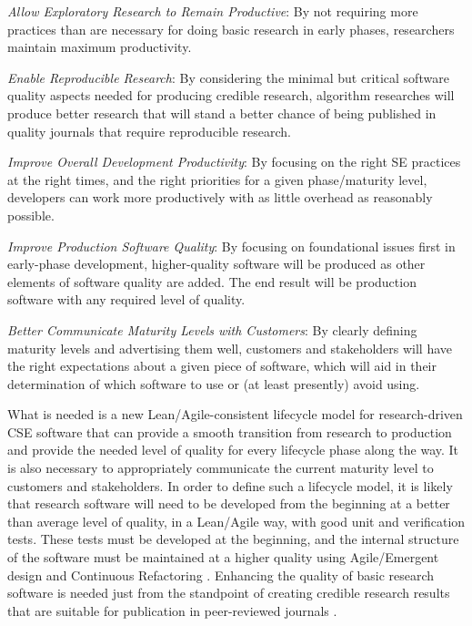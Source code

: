 \documentclass[11pt]{SANDreport}
\begin{document}
\begin{compactitem}

{}\item\textit{Allow Exploratory Research to Remain Productive}: By
not requiring more practices than are necessary for doing basic
research in early phases, researchers maintain maximum productivity.

{}\item\textit{Enable Reproducible Research}: By considering the
minimal but critical software quality aspects needed for producing
credible research, algorithm researches will produce better research
that will stand a better chance of being published in quality journals
that require reproducible research.

{}\item\textit{Improve Overall Development Productivity}: By focusing
on the right SE practices at the right times, and the right priorities
for a given phase/maturity level, developers can work more
productively with as little overhead as reasonably possible.

{}\item\textit{Improve Production Software Quality}: By focusing on
foundational issues first in early-phase development, higher-quality
software will be produced as other elements of software quality are
added.  The end result will be production software with any required
level of quality.

{}\item\textit{Better Communicate Maturity Levels with Customers}: By
clearly defining maturity levels and advertising them well,
customers and stakeholders will have the right expectations about a
given piece of software, which will  aid in their determination of which
software to use or (at least presently) avoid using.

\end{compactitem}

What is needed is a new Lean/Agile-consistent lifecycle model for
research-driven CSE software that can provide a smooth transition from
research to production and provide the needed level of quality for
every lifecycle phase along the way.  It is also necessary to
appropriately communicate the current maturity level to customers and
stakeholders.  In order to define such a lifecycle model, it is likely
that research software will need to be developed from the beginning at
a better than average level of quality, in a Lean/Agile way, with good
unit and verification tests.  These tests must be developed at the
beginning, and the internal structure of the software must be
maintained at a higher quality using Agile/Emergent design and
Continuous Refactoring {}\cite{ref:emergent_design_08}.  Enhancing the
quality of basic research software is needed just from the standpoint
of creating credible research results that are suitable for
publication in peer-reviewed journals
{}\cite{CompSciDemandsNewParadigm05,
ScientistsNightmareFiveRetractions2006}.
\end{document}
